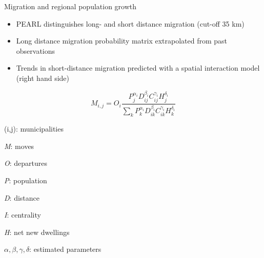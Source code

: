 \documentclass[final, 12pt, aspectratio=169, xcolor={dvipsnames}]{beamer}
\begin{document}
\begin{frame}{Migration and regional population growth}
  \begin{minipage}[t]{0.48\linewidth}%
    \begin{itemize}
    \item PEARL distinguishes long- and short distance migration (cut-off 35 km)
      \item Long distance migration probability matrix extrapolated from past observations
      \item Trends in short-distance migration predicted with a spatial interaction model (right hand side)
      \end{itemize}
    
\end{minipage}%
\hfill%
\begin{minipage}[t]{0.48\linewidth}%
    $$M_{i,j} = O_{i} \frac{P_{j}^{\alpha_{i}} D_{ij}^{\beta_{i}} C_{ij}^{\gamma_{i}} H_{j}^{\delta_{i}}}{\sum_{k}P_{k}^{\alpha_{i}} D_{ik}^{\beta_{i}} C_{ik}^{\gamma_{i}} H_{k}^{\delta_{i}}}$$
    
  \begin{description}
    \tiny
  \item (i,j): municipalities
  \item \textit{M}: moves
  \item \textit{O}: departures 
  \item \textit{P}: population
  \item \textit{D}: distance
  \item \textit{I}: centrality
  \item \textit{H}: net new dwellings
  \item \textit{$\alpha, \beta, \gamma, \delta$}: estimated parameters
  \end{description}

\end{minipage}
  
\end{frame}
\end{document}
